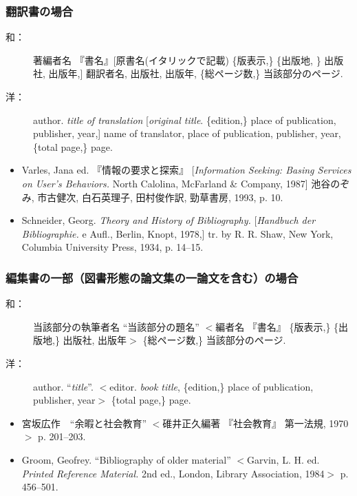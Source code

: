		\subsubsection{翻訳書の場合}

			\begin{description}
				\item[和：] 著編者名 『書名』[原書名(イタリックで記載) \{版表示,\}
				\{出版地, \} 出版社, 出版年,] 翻訳者名, 出版社, 出版年, \{総ページ数,\} 当該部分のページ.
				\item[洋：] author. \textit{title of translation} [\textit{original title}. \{edition,\} place of publication, publisher, year,] name of translator, place of publication, publisher, year, \{total page,\} page.
			\end{description}

			\begin{screen} \begin{itemize}
				\item Varles, Jana ed. 『情報の要求と探索』 [\textit{Information Seeking:
				 Basing Services on User's Behaviors.} North Calolina,
				 McFarland \& Company, 1987] 池谷のぞみ,	 市古健次, 白石英理子, 田村俊作訳,
				 勁草書房, 1993, p. 10.

				\item Schneider, Georg. \textit{Theory and History of Bibliography.}
				 [\textit{Handbuch der Bibliographie.} e Aufl., Berlin, Knopt, 1978,]
				 tr. by R. R. Shaw, New York, Columbia University Press, 1934, p. 14--15.
			\end{itemize} \end{screen}

		\subsubsection{編集書の一部（図書形態の論文集の一論文を含む）の場合}

			\begin{description}
				\item[和：] 当該部分の執筆者名 ``当該部分の題名'' $<$編者名 『書名』 \{版表示,\} \{出版地,\} 出版社, 出版年$>$ \{総ページ数,\} 当該部分のページ.
				\item[洋：] author. ``\textit{title}''. $<$editor. \textit{book title}, \{edition,\} place of publication, publisher, year$>$ \{total page,\} page.
			\end{description}

			\begin{screen} \begin{itemize}
				\item 宮坂広作　``余暇と社会教育'' $<$碓井正久編著 『社会教育』 第一法規, 1970$>$ p. 201--203.

				\item Groom, Geofrey. ``Bibliography of older material'' $<$Garvin, L. H. ed. \textit{Printed Reference Material.} 2nd ed., London, Library Association, 1984$>$ p. 456--501.
			\end{itemize} \end{screen}


